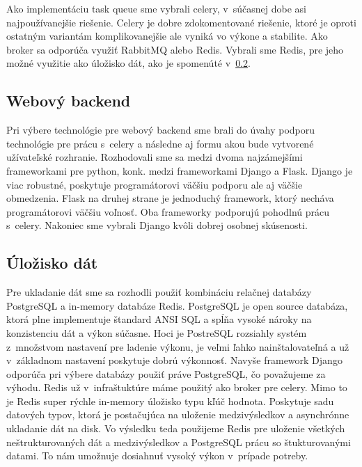 Ako implementáciu task queue sme vybrali celery, v~súčasnej dobe asi najpoužívanejšie riešenie. Celery je dobre zdokomentované riešenie, ktoré je oproti ostatným variantám komplikovanejšie ale vyniká vo výkone a stabilite. Ako broker sa odporúča využiť RabbitMQ alebo Redis. Vybrali sme Redis, pre jeho možné využitie ako úložisko dát, ako je spomenúté v~\ref{sec:store}.

\subsection{Webový backend}
Pri výbere technológie pre webový backend sme brali do úvahy podporu technológie pre prácu s~celery a následne aj formu akou bude vytvorené užívateľské rozhranie. Rozhodovali sme sa medzi dvoma najzámejšími frameworkami pre python, konk. medzi frameworkami Django a Flask. Django je viac robustné, poskytuje programátorovi väčšiu podporu ale aj väčšie obmedzenia. Flask na druhej strane je jednoduchý framework, ktorý necháva programátorovi väčšiu voľnosť. Oba frameworky podporujú pohodlnú prácu s~celery. Nakoniec sme vybrali Django kvôli dobrej osobnej skúsenosti.

\subsection{Úložisko dát}
\label{sec:store}
Pre ukladanie dát sme sa rozhodli použiť kombináciu relačnej databázy PostgreSQL a in-memory databáze Redis. PostgreSQL je open source databáza, ktorá plne implementuje štandard ANSI SQL a spĺňa vysoké nároky na konzistenciu dát a výkon súčasne. Hoci je PostreSQL  rozsiahly systém z~množstvom nastavení pre ladenie výkonu, je veľmi ľahko nainštalovateľná a už v~základnom nastavení poskytuje dobrú výkonnosť. Navyše framework Django odporúča pri výbere databázy použiť práve PostgreSQL, čo považujeme za výhodu. Redis už v~infraštuktúre máme použitý ako broker pre celery. Mimo to je Redis super rýchle in-memory úložisko typu kľúč hodnota. Poskytuje sadu datových typov, ktorá je postačujúca na uloženie medzivýsledkov a asynchrónne ukladanie dát na disk.
Vo výsledku teda použijeme Redis pre uloženie všetkých neštrukturovaných dát a medzivýsledkov a PostgreSQL prácu so štukturovanými datami. To nám umožnuje dosiahnuť vysoký výkon v~prípade potreby.

